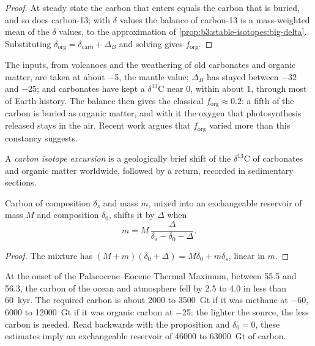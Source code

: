 \begin{proof}
At steady state the carbon that enters equals the carbon that is buried, and so
does carbon-13; with $\delta$ values the balance of carbon-13 is a mass-weighted
mean of the $\delta$ values, to the approximation of
\cref{prop:b3:stable-isotopes:big-delta}. Substituting $\delta_{\mathrm{org}} =
\delta_{\mathrm{carb}} + \Delta_B$ and solving gives $f_{\mathrm{org}}$.
\end{proof}

The inputs, from volcanoes and the weathering of old carbonates and organic
matter, are taken at about \qty{-5}{\permil}, the mantle value; $\Delta_B$ has
stayed between $-32$ and \qty{-25}{\permil}; and carbonates have kept a
$\delta^{13}\mathrm C$ near 0, within about \qty{1}{\permil}, through most of
Earth history. The balance then gives the classical $f_{\mathrm{org}} \approx
0.2$: a fifth of the carbon is buried as organic matter, and with it the
oxygen that photosynthesis released stays in the air. Recent work argues that
$f_{\mathrm{org}}$ varied more than this constancy suggests.

\begin{definition}\label{def:b3:stable-isotopes:cie}
A \emph{carbon isotope excursion} is a
geologically brief shift of the $\delta^{13}\mathrm C$ of carbonates and organic
matter worldwide, followed by a return, recorded in sedimentary sections.
\end{definition}

\begin{proposition}\label{prop:b3:stable-isotopes:cie-mass}
Carbon of composition $\delta_s$ and mass $m$, mixed into an exchangeable
reservoir of mass $M$ and composition $\delta_0$, shifts it by $\Delta$ when
\[
m = M\,\frac{\Delta}{\delta_s - \delta_0 - \Delta}.
\]
\end{proposition}

\begin{proof}
The mixture has $(M + m)(\delta_0 + \Delta) = M\delta_0 + m\delta_s$, linear in
$m$.
\end{proof}

At the onset of the Palaeocene--Eocene Thermal Maximum, between 55.5 and
\qty{56.3}{\Ma}, the carbon of the ocean and atmosphere fell by 2.5 to
\qty{4.0}{\permil} in less than \qty{60}{kyr}. The required carbon is about
2000 to \qty{3500}{Gt} if it was methane at \qty{-60}{\permil}, 6000 to
\qty{12000}{Gt} if it was organic carbon at \qty{-25}{\permil}: the lighter
the source, the less carbon is needed. Read backwards with the proposition
and $\delta_0 = 0$, these estimates imply an exchangeable reservoir of \num{46000}
to \qty{63000}{Gt} of carbon.

